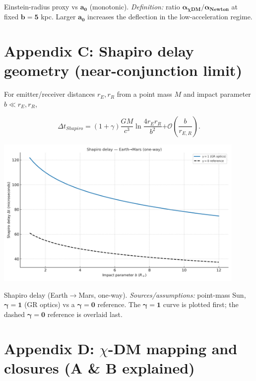 \documentclass[
]{article}
\begin{document}
Einstein-radius proxy vs \(\mathbf{a}_{\mathbf{0}}\) (monotonic).
\emph{Definition:} ratio
\(\mathbf{\alpha}_{\mathbf{\chi}\mathbf{DM}}\mathbf{/}\mathbf{\alpha}_{\mathbf{Newton}}\)
at fixed \(\mathbf{b}\mathbf{=}\mathbf{5}\) kpc. Larger
\(\mathbf{a}_{\mathbf{0}}\) increases the deflection in the
low-acceleration regime.

\section{Appendix C: Shapiro delay geometry (near-conjunction
limit)}\label{appendix-c-shapiro-delay-geometry-near-conjunction-limit}

For emitter/receiver distances \(r_{E},r_{R}\) from a point mass \(M\)
and impact parameter \(b \ll r_{E},r_{R}\),

\[\Delta t_{Shapiro} = (1 + \gamma)\frac{GM}{c^{3}}\ln\frac{4r_{E}r_{R}}{b^{2}}\mathcal{+ O}\left( \frac{b}{r_{E,R}} \right).\]

\includegraphics[width=4.78333in,height=2.87in,alt={A graph of a person with a blue line AI-generated content may be incorrect.}]{letter_media/media/image8.png}

Shapiro delay (Earth\(\mathbf{\rightarrow}\)Mars, one-way).
\emph{Sources/assumptions:} point-mass Sun,
\(\mathbf{\gamma}\mathbf{=}\mathbf{1}\) (GR optics) vs a
\(\mathbf{\gamma}\mathbf{=}\mathbf{0}\) reference. The
\(\mathbf{\gamma}\mathbf{=}\mathbf{1}\) curve is plotted first; the
dashed \(\mathbf{\gamma}\mathbf{=}\mathbf{0}\) reference is overlaid
last.

\section{\texorpdfstring{Appendix D: \(\chi\)-DM mapping and closures (A
\& B
explained)}{Appendix D: \textbackslash chi-DM mapping and closures (A \& B explained)}}\label{appendix-d-chi-dm-mapping-and-closures-a-b-explained}
\end{document}

